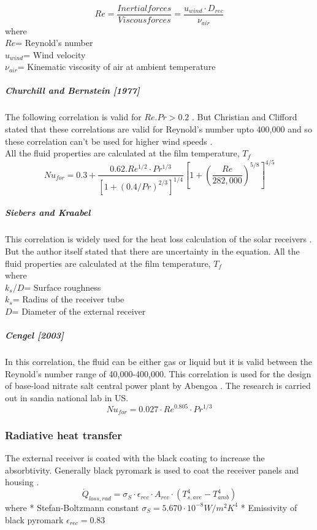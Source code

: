 \begin{equation}
Re= \frac{Inertial forces}{Viscous forces}=\frac{u_{wind}\cdot D_{rec}}{\nu_{air}}
\end{equation}
where\\
$Re$= Reynold's number\\
$u_{wind}$= Wind velocity\\
$\nu_{air}$= Kinematic viscosity of air at ambient temperature\\

\subparagraph{ Churchill and Bernstein [1977] \cite {Cengel.2003}}
The following correlation is valid for $Re.Pr > 0.2$ \cite{Cengel.2003}. But Christian and Clifford stated that these correlations are valid for Reynold's number upto 400,000 and so these correlation can't be used for higher wind speeds \cite{Christian.2012}.\\
All the fluid properties are calculated at the film temperature, $T_f$\\
\begin{equation}
Nu_{for}=0.3+\frac{0.62.Re^{1/2}\cdot Pr^{1/3}}{[1+(0.4/Pr)^{2/3}]^{1/4}}\left[1+\left(\frac{Re}{282,000}\right)^{5/8}\right]^{4/5}
\end{equation}


\subparagraph{Siebers and Kraabel \cite{Siebers.1984}}
This correlation is widely used for the heat loss calculation of the solar receivers \cite{Christian.2012}. But the author itself stated that there are  uncertainty in the equation. All the fluid properties are calculated at the film temperature, $T_f$\\

where\\
$k_s/D$= Surface roughness\\
$k_s$= Radius of the receiver tube\\
$D$= Diameter of the external receiver\\

\subparagraph{Cengel [2003] \cite{Cengel.2003}}
In this correlation, the fluid can be either gas or liquid but it is valid between the Reynold's number range of 40,000-400,000. This correlation is used for the design of base-load nitrate salt central power plant by Abengoa \cite{Tilley.2014}. The research is carried out in sandia national lab in US.\\
\begin{equation}
Nu_{for}=0.027\cdot Re^{0.805}\cdot Pr^{1/3}
\end{equation}
\subsubsection{Radiative heat transfer}
The external receiver is coated with the black coating to increase the absorbtivity. Generally black pyromark is used to coat the receiver panels and housing \cite{Zavoico.2001}.\\
\begin{equation}
\dot Q_{loss,rad}=\sigma_S\cdot \epsilon_{rec}\cdot A_{rec}\cdot (T_{s,ave}^4-T_{amb}^4)
\end{equation}
where
* Stefan-Boltzmann constant $\sigma_S = 5.670 \cdot 10^{-8} W / m^2 K^4$
* Emissivity of black pyromark \cite{Zavoico.2001} $\epsilon_{rec} = 0.83$

